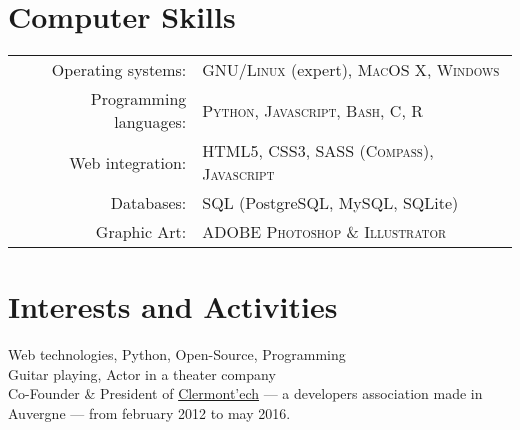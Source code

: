 \documentclass[a4paper,10pt]{article}
\begin{document}

\section{Computer Skills}
\begin{tabular}{rl}
Operating systems:& \textsc{GNU/Linux} (expert), \textsc{MacOS X},  \textsc{Windows}\\
Programming languages:& \textsc{Python}, \textsc{Javascript}, \textsc{Bash}, \textsc{C}, \textsc{R}\\
Web integration:& \textsc{HTML5}, \textsc{CSS3}, \textsc{SASS} (\textsc{Compass}), \textsc{Javascript}\\
Databases:& \textsc{SQL} (PostgreSQL, MySQL, SQLite) \\
Graphic Art:& \textsc{ADOBE Photoshop} \& \textsc{Illustrator} \\
\end{tabular}

\section{Interests and Activities}
Web technologies, Python, Open-Source, Programming\\
Guitar playing, Actor in a theater company\\
Co-Founder \& President of \href{http://clermontech.org}{Clermont'ech} — a developers association made in Auvergne — from february 2012 to may 2016.\\
\end{document}
